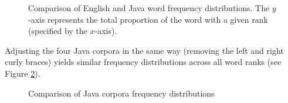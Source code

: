 \documentclass{article}
\begin{document}
\begin{figure}
\caption{Comparison of English and Java word frequency distributions.
    The $y$-axis represents the total proportion of the word with a given
    rank (specified by the $x$-axis).}
\label{english-frequency}
\end{figure}
 
Adjusting the four Java corpora in the same way (removing the left and right
curly braces) yields similar frequency distributions across all word ranks
(see Figure \ref{java-frequency}).
 
\begin{figure}
\caption{Comparison of Java corpora frequency distributions}
\label{java-frequency}
\end{figure}

\end{document}
